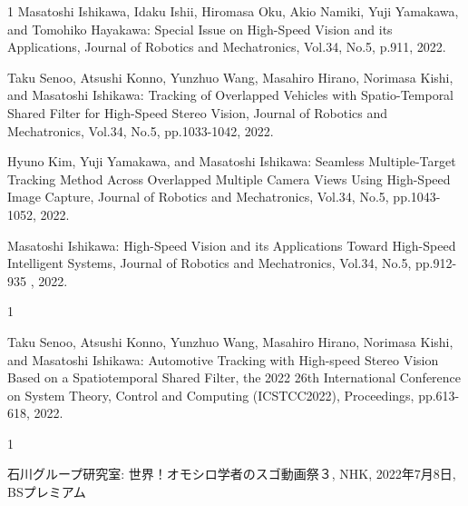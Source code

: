 \begin{雑誌論文}{1}
Masatoshi Ishikawa, Idaku Ishii, Hiromasa Oku, Akio Namiki, Yuji Yamakawa, and Tomohiko Hayakawa: Special Issue on High-Speed Vision and its Applications, Journal of Robotics and Mechatronics, Vol.34, No.5, p.911, 2022.

Taku Senoo, Atsushi Konno, Yunzhuo Wang, Masahiro Hirano, Norimasa Kishi, and Masatoshi Ishikawa: Tracking of Overlapped Vehicles with Spatio-Temporal Shared Filter for High-Speed Stereo Vision, Journal of Robotics and Mechatronics, Vol.34, No.5, pp.1033-1042, 2022.

Hyuno Kim, Yuji Yamakawa, and Masatoshi Ishikawa: Seamless Multiple-Target Tracking Method Across Overlapped Multiple Camera Views Using High-Speed Image Capture, Journal of Robotics and Mechatronics, Vol.34, No.5, pp.1043-1052, 2022.

Masatoshi Ishikawa: High-Speed Vision and its Applications Toward High-Speed Intelligent Systems, Journal of Robotics and Mechatronics, Vol.34, No.5, pp.912-935 , 2022.

\end{雑誌論文}

\begin{発表}{1}

Taku Senoo, Atsushi Konno, Yunzhuo Wang, Masahiro Hirano, Norimasa Kishi, and Masatoshi Ishikawa: Automotive Tracking with High-speed Stereo Vision Based on a Spatiotemporal Shared Filter, the 2022 26th International Conference on System Theory, Control and Computing (ICSTCC2022), Proceedings, pp.613-618, 2022.

\end{発表}

\begin{報道}{1}

石川グループ研究室: 世界！オモシロ学者のスゴ動画祭３, NHK, 2022年7月8日, BSプレミアム

\end{報道}